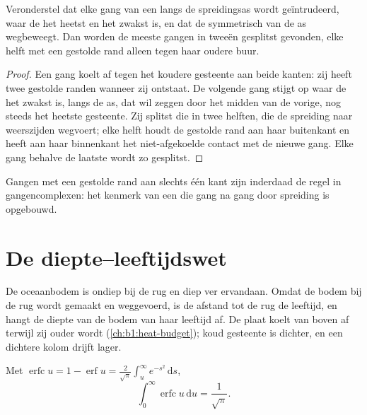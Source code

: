\begin{proposition}\label{prop:b1:rifts-ridges-margins:dykes}
Veronderstel dat elke gang van een  langs de spreidingsas wordt geïntrudeerd, waar de  het heetst en het zwakst is, en dat de  symmetrisch van de as wegbeweegt. Dan worden de meeste gangen in tweeën gesplitst gevonden, elke helft met een gestolde rand alleen tegen haar oudere buur.
\end{proposition}

\begin{proof}
Een gang koelt af tegen het koudere gesteente aan beide kanten: zij heeft twee gestolde randen wanneer zij ontstaat. De volgende gang stijgt op waar de  het zwakst is, langs de as, dat wil zeggen door het midden van de vorige, nog steeds het heetste gesteente. Zij splitst die in twee helften, die de spreiding naar weerszijden wegvoert; elke helft houdt de gestolde rand aan haar buitenkant en heeft aan haar binnenkant het niet-afgekoelde contact met de nieuwe gang. Elke gang behalve de laatste wordt zo gesplitst.
\end{proof}

Gangen met een gestolde rand aan slechts één kant zijn inderdaad de regel in gangencomplexen: het kenmerk van een  die gang na gang door spreiding is opgebouwd.


\section{De diepte--leeftijdswet}\label{sec:b1:rifts-ridges-margins:depth-age}

De oceaanbodem is ondiep bij de rug en diep ver ervandaan. Omdat de bodem bij de rug wordt gemaakt en weggevoerd, is de afstand tot de rug de leeftijd, en hangt de diepte van de bodem van haar leeftijd af. De plaat koelt van boven af terwijl zij ouder wordt (\cref{ch:b1:heat-budget}); koud gesteente is dichter, en een dichtere kolom drijft lager.

\begin{lemma}\label{lem:b1:rifts-ridges-margins:erfc}
Met $\operatorname{erfc} u = 1 - \operatorname{erf} u =
\frac{2}{\sqrt\pi}\int_u^\infty e^{-s^2}\,\mathrm ds$,
\[
  \int_0^\infty \operatorname{erfc} u \,\mathrm du = \frac{1}{\sqrt\pi}.
\]
\end{lemma}

